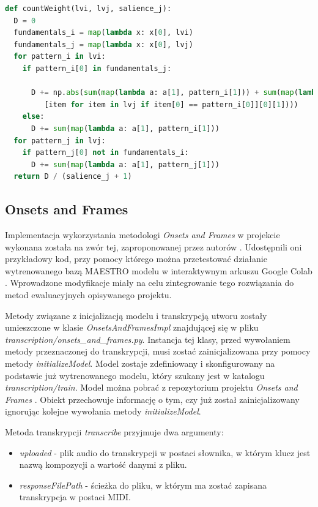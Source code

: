 \documentclass[12pt,a4paper,twoside]{mwart}
\begin{document}
\begin{lstlisting}[language=Python, caption={Funkcja wyliczająca wagę krawędzi w algorytmie śledzenia wysokości nut}, captionpos=b, label={code:petrusPitchTracking}, numbers=none]
def countWeight(lvi, lvj, salience_j):
  D = 0
  fundamentals_i = map(lambda x: x[0], lvi)
  fundamentals_j = map(lambda x: x[0], lvj)
  for pattern_i in lvi:
    if pattern_i[0] in fundamentals_j:
      
      D += np.abs(sum(map(lambda a: a[1], pattern_i[1])) + sum(map(lambda a: a[1],
         [item for item in lvj if item[0] == pattern_i[0]][0][1])))
    else:
      D += sum(map(lambda a: a[1], pattern_i[1]))
  for pattern_j in lvj:
    if pattern_j[0] not in fundamentals_i:
      D += sum(map(lambda a: a[1], pattern_j[1]))
  return D / (salience_j + 1)
\end{lstlisting}

\subsection{Onsets and Frames}\label{sec:impl:onsetsAndFrames}
Implementacja wykorzystania metodologi \textit{Onsets and Frames} w projekcie wykonana została na zwór tej, zaproponowanej przez autorów \cite{Transcription:Hawthorne:OnsetsAndFrames}. Udostępnili oni przykładowy kod, przy pomocy którego można przetestować działanie wytrenowanego bazą MAESTRO modelu w interaktywnym arkuszu Google Colab \cite{Transcription:OnsetsAndFrames:Colab}. Wprowadzone modyfikacje miały na celu zintegrowanie tego rozwiązania do metod ewaluacyjnych opisywanego projektu.

Metody związane z inicjalizacją modelu i transkrypcją utworu zostały umieszczone w klasie \textit{OnsetsAndFramesImpl} znajdującej się w pliku \textit{transcription/onsets\_and\_frames.py}. Instancja tej klasy, przed wywołaniem metody przeznaczonej do transkrypcji, musi zostać zainicjalizowana przy pomocy metody \textit{initializeModel}. Model zostaje zdefiniowany i skonfigurowany na podstawie już wytrenowanego modelu, który szukany jest w katalogu \textit{transcription/train}. Model można pobrać z repozytorium projektu \textit{Onsets and Frames} \cite{Transcription:OnsetsAndFrames:Github}. Obiekt przechowuje informację o tym, czy już został zainicjalizowany ignorując kolejne wywołania metody \textit{initializeModel}.

Metoda transkrypcji \textit{transcribe} przyjmuje dwa argumenty:
\begin{itemize}
  \item  \textit{uploaded} - plik audio do transkrypcji w postaci słownika, w którym klucz jest nazwą kompozycji a wartość danymi z pliku. 
  \item \textit{responseFilePath} - ścieżka do pliku, w którym ma zostać zapisana transkrypcja w postaci MIDI.
\end{itemize}
\end{document}
